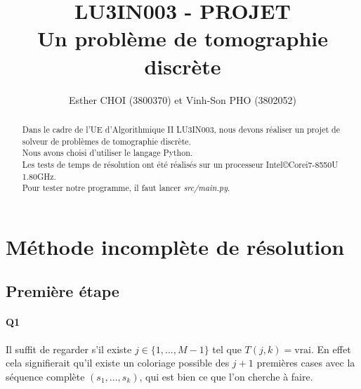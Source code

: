 \documentclass[12pt]{article}
\title{LU3IN003 - PROJET \\ Un problème de tomographie discrète\\}
\author{Esther CHOI (3800370) et Vinh-Son PHO (3802052)}
\newcommand{\true}{\text{vrai}}
\begin{document}
	\maketitle
	\tableofcontents
	
	
	\begin{abstract}
		Dans le cadre de l'UE d'Algorithmique II LU3IN003, nous devons réaliser un projet de solveur de problèmes de tomographie discrète. \\
		Nous avons choisi d'utiliser le langage Python. \\
		Les tests de temps de résolution ont été réalisés sur un processeur Intel\copyright Core\texttrademark i7-8550U 1.80GHz. \\
		Pour tester notre programme, il faut lancer \textit{src/main.py}.
	\end{abstract}
	
	
	\newpage
	
	
	\section{Méthode incomplète de résolution}
	
		\subsection{Première étape}
		
			\paragraph{Q1}
				Il suffit de regarder s'il existe $ j \in \{1,...,M-1\} $ tel que $ T(j,k) = \true $. En effet cela signifierait qu'il existe un coloriage possible des $ j+1 $ premières cases avec la séquence complète $ (s_1,...,s_k) $, qui est bien ce que l'on cherche à faire.
		
\end{document}
